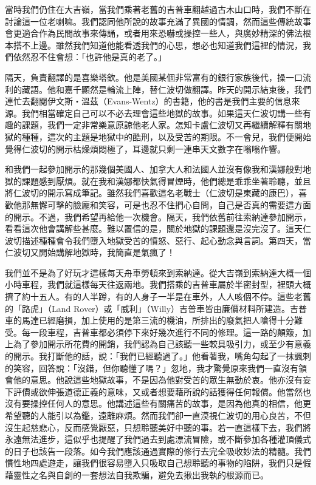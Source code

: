 當時我們仍住在大吉嶺，當我們乘著老舊的吉普車翻越過古木山口時，我們不斷在討論這一位老喇嘛。我們認同他所說的故事充滿了異國的情調，然而這些傳統故事會更適合作為民間故事來傳誦，或者用來恐嚇或操控一些人，與廣妙精深的佛法根本搭不上邊。雖然我們知道他能看透我們的心思，想必也知道我們這裡的情況，我們依然忍不住會想：「也許他是真的老了。」

隔天，負責翻譯的是喜樂塔欽。他是美國某個非常富有的銀行家族後代，操一口流利的藏語。他和嘉千顯然是輪流上陣，替仁波切做翻譯。昨天的開示結束後，我們連忙去翻閱伊文斯‧溫茲（Evans-Wentz）的書籍，他的書是我們主要的信息來源。我們相當確定自己可以不必去理會這些地獄的故事。如果這天仁波切講一些有趣的課題，我們一定非常樂意原諒他老人家。怎知卡盧仁波切又再繼續解釋有關地獄的種種，這次的主題是地獄中的酷刑，以及受苦的期限。不一會兒，我們便開始覺得仁波切的開示枯燥煩悶極了，耳邊就只剩一連串天文數字在嗡嗡作響。

和我們一起參加開示的那幾個美國人、加拿大人和法國人並沒有像我和漢娜般對地獄的課題感到厭煩。就在我和漢娜都快氣得冒煙時，他們總是乖乖坐著聆聽，並且將仁波切的開示寫成筆記。雖然我們喜歡這名老戰士（仁波切是東藏的康巴），喜歡他那無懈可擊的臉龐和笑容，可是也忍不住捫心自問，自己是否真的需要這方面的開示。不過，我們希望再給他一次機會。隔天，我們依舊前往索納達參加開示，看看這次他會講解些甚麼。難以置信的是，關於地獄的課題還是沒完沒了。這天仁波切描述種種會令我們墮入地獄受苦的憤怒、惡行、起心動念與言詞。第四天，當仁波切又開始講解地獄時，我簡直是氣瘋了！

我們並不是為了好玩才這樣每天舟車勞頓來到索納達。從大吉嶺到索納達大概一個小時車程，我們就這樣每天往返兩地。我們搭乘的吉普車屬於半密封型，裡頭大概擠了約十五人。有的人半蹲，有的人身子一半是在車外，人人咳個不停。這些老舊的「路虎」（Land
Rover）或「威利」（Willy）吉普車皆由廉價材料所建造。吉普車的馬達已經磨損，加上使用的是第三流的機油，所排出的廢氣把人嗆得十分難受。每一段車程，吉普車都必須停下來好幾次進行不同的修理。這一路的顛簸，加上為了參加開示所花費的開銷，我們認為自己該聽一些較具吸引力，或至少有意義的開示。我打斷他的話，說：「我們已經聽過了。」他看著我，嘴角勾起了一抹諷刺的笑容，回答說：「沒錯，但你聽懂了嗎？」忽地，我才驚覺原來我們一直沒有領會他的意思。他說這些地獄故事，不是因為他對受苦的眾生無動於衷。他亦沒有妄下評價或欲伸張道德正義的意味，又或者想要藉所說的話獲得任何報償。他當然也沒有要操控任何人的意思。他講述這些有關痛苦的故事，是因為他真的相信，他更希望聽的人能引以為鑑，遠離麻煩。然而我們卻一直漠視仁波切的用心良苦，不但沒生起慈悲心，反而感覺厭惡，只想聆聽美好中聽的事。若一直這樣下去，我們將永遠無法進步，這似乎也提醒了我們過去到處漂流冒險，或不斷參加各種灌頂儀式的日子也該告一段落。如今我們應該通過實際的修行去完全吸收妙法的精髓。我們慣性地四處遊走，讓我們很容易墮入只吸取自己想聆聽的事物的陷阱，我們只是假藉靈性之名與自創的一套想法自我欺騙，避免去揪出我執的根源而已。

